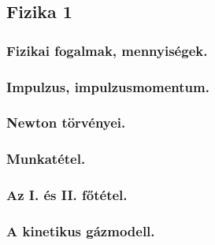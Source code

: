 \subsection{Fizika 1}
\subsubsection{Fizikai fogalmak, mennyiségek.}

\subsubsection{Impulzus, impulzusmomentum.}

\subsubsection{Newton törvényei.}

\subsubsection{Munkatétel.}

\subsubsection{Az I. és II. főtétel.}

\subsubsection{A kinetikus gázmodell.}
